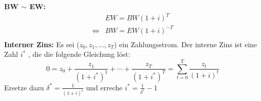 \documentclass[leqno]{scrartcl}
\begin{document}
\begin{multicols}{4}
\begin{equation*}
  \end{equation*}  
\textbf{BW $\sim$ EW:}
  \begin{equation*}\label{relation}
    \begin{split}
    &EW = BW (1+i)^{T}\\
    \iff &BW = EW (1+i)^{-T} \\
    \end{split}
  \end{equation*}
\textbf{Interner Zins:}\label{internerzins}
  Es sei ($z_0, z_1, \dots, z_T$) ein Zahlungsstrom. Der interne Zins ist eine Zahl $i^*$ , die 
  die folgende Gleichung löst:
  $$0 = z_0 + \frac{z_1}{(1+i^*)^1} + \cdots + \frac{z_T}{(1+i^*)^T} = \sum^T_{t=0}\frac{z_t}{(1+i)^t}$$
  Ersetze dazu $\delta^* = \frac{1}{(1+i)^t}$ und erreche $i^* = \frac{1}{\delta^*}-1$
  
  
  
  
  
  
  



\end{multicols}
\end{document}
